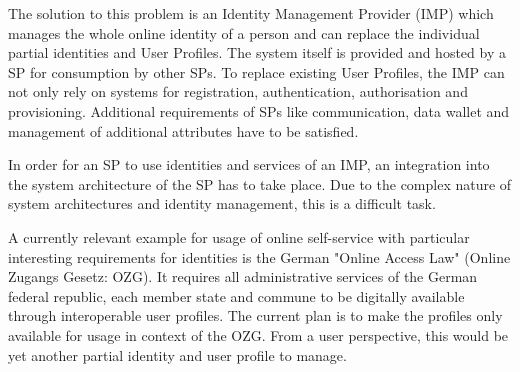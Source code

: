 The solution to this problem is an Identity Management Provider (IMP) which manages the whole online identity of a person and can replace the individual partial identities and User Profiles. The system itself is provided and hosted by a SP for consumption by other SPs. To replace existing User Profiles, the IMP can not only rely on systems for registration, authentication, authorisation and provisioning. Additional requirements of SPs like communication, data wallet and management of additional attributes have to be satisfied.

In order for an SP to use identities and services of an IMP, an integration into the system architecture of the SP has to take place. Due to the complex nature of system architectures and identity management, this is a difficult task.

A currently relevant example for usage of online self-service with particular interesting requirements for identities is the German "Online Access Law" (Online Zugangs Gesetz: OZG). It requires all administrative services of the German federal republic, each member state and commune to be digitally available through interoperable user profiles. The current plan is to make the profiles only available for usage in context of the OZG. From a user perspective, this would be yet another partial identity and user profile to manage.